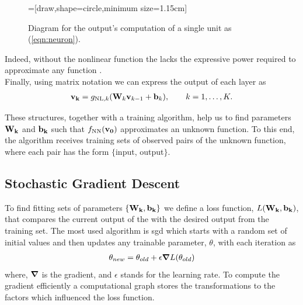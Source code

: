 \begin{figure}[H]
=[draw,shape=circle,minimum size=1.15cm]
\centering
{}
\caption{Diagram for the output's computation of a single unit as (\ref{eqn:neuron}).}
\end{figure}
Indeed, without the nonlinear function the  lacks the expressive power required to approximate any function \cite{HORNIK1989359}.\\
Finally, using matrix notation we can express the output of each layer as
\begin{align}
	\vb{v_k} = g_{\text{NL},k}(\vb{W}_k\vb{v}_{k-1}+\vb{b}_k), \qquad k = 1, \dots, K.
\end{align}

These structures, together with a training algorithm, help us to find parameters $\bold{W_k}$ and $\bold{b_k}$ such that $f_{\text{NN}}(\bold{v_0})$ approximates an unknown function. To this end, the algorithm receives training sets of observed pairs of the unknown function, where each pair has the form $\{$input, output$\}$.

\subsection{Stochastic Gradient Descent}
To find fitting sets of parameters $\{\bold{W_k}, \bold{b_k}\}$ we define a loss function,  $L(\bold{W_k} , \bold{b_k})$, that compares the current output of the  with the desired output from the training set. The most used algorithm is \acrfull{sgd} which starts with a random set of initial values and then updates any trainable parameter, $\theta$, with each iteration as
\begin{align}
	{\theta}_{new} = {\theta}_{old} + \epsilon \grad L({\theta}_{old}) %
\end{align}
where, $\grad$ is the gradient, and $\epsilon$ stands for the learning rate. To compute the gradient efficiently a computational graph stores the transformations to the factors which influenced the loss function. 

